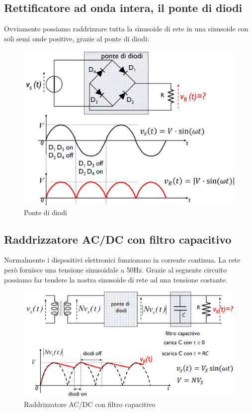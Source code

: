 \paragraph{}
\subsection{Rettificatore ad onda intera, il ponte di diodi}
Ovviamente possiamo raddrizzare tutta la sinusoide di rete in una sinusoide con soli semi onde positive, grazie al ponte di diodi:

\begin{figure}[htbp]
    \centering
    \includegraphics[width=0.65\linewidth]{img/ponte_diodi.png}
    \caption{Ponte di diodi}
    
\end{figure}

\paragraph{}
\subsection{Raddrizzatore AC/DC con filtro capacitivo}
Normalmente i dispositivi elettronici funzionano in corrente continua. La rete però fornisce una tensione sinusoidale a 50Hz.
Grazie al seguente circuito possiamo far tendere la nostra sinusoide di rete ad una tensione costante.

\begin{figure}[htbp]
    \centering
    \includegraphics[width=0.75\linewidth]{img/raddrizzatore.png}
    \caption{Raddrizzatore AC/DC con filtro capacitivo}    
\end{figure}


